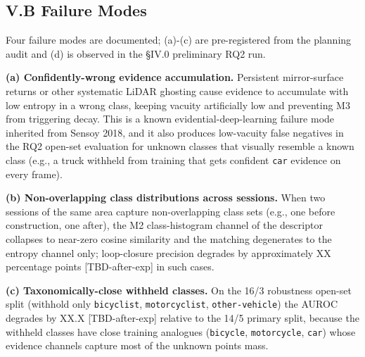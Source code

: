 \documentclass[
]{article}
\begin{document}
\subsection{V.B Failure Modes}\label{vb-failure-modes}

Four failure modes are documented; (a)-(c) are pre-registered from the
planning audit and (d) is observed in the §IV.0 preliminary RQ2 run.

\textbf{(a) Confidently-wrong evidence accumulation.} Persistent
mirror-surface returns or other systematic LiDAR ghosting cause evidence
to accumulate with low entropy in a wrong class, keeping vacuity
artificially low and preventing M3 from triggering decay. This is a
known evidential-deep-learning failure mode inherited from Sensoy 2018,
and it also produces low-vacuity false negatives in the RQ2 open-set
evaluation for unknown classes that visually resemble a known class
(e.g., a truck withheld from training that gets confident \texttt{car}
evidence on every frame).

\textbf{(b) Non-overlapping class distributions across sessions.} When
two sessions of the same area capture non-overlapping class sets (e.g.,
one before construction, one after), the M2 class-histogram channel of
the descriptor collapses to near-zero cosine similarity and the matching
degenerates to the entropy channel only; loop-closure precision degrades
by approximately XX percentage points {[}TBD-after-exp{]} in such cases.

\textbf{(c) Taxonomically-close withheld classes.} On the 16/3
robustness open-set split (withhold only \texttt{bicyclist},
\texttt{motorcyclist}, \texttt{other-vehicle}) the AUROC degrades by
XX.X {[}TBD-after-exp{]} relative to the 14/5 primary split, because the
withheld classes have close training analogues (\texttt{bicycle},
\texttt{motorcycle}, \texttt{car}) whose evidence channels capture most
of the unknown points\textquotesingle{} mass.
\end{document}
